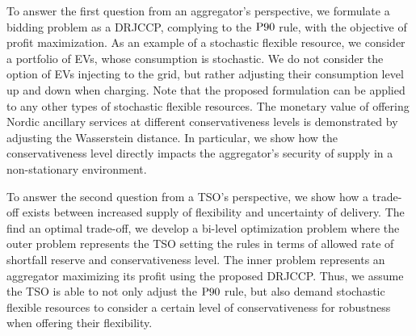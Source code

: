 \documentclass[conference]{IEEEtran}
\begin{document}
To answer the first question from an aggregator's perspective, we formulate a bidding problem as a \ac{DRJCCP}, complying to the $\rm{P90}$ rule, with the objective of profit maximization.  
As an example of a stochastic flexible resource, we consider a portfolio of \acp{EV}, whose consumption  is stochastic. We do not consider the option of EVs injecting to the grid, but rather adjusting their consumption level up and down when charging. 
Note that the proposed formulation can be applied to any other types of stochastic flexible resources. The monetary value of offering Nordic ancillary services at different conservativeness levels is demonstrated by adjusting the Wasserstein distance. In particular, we show how the conservativeness level directly impacts the aggregator's security of supply in a non-stationary environment.

To answer the second question from a TSO's perspective, we show how a trade-off exists between increased supply of flexibility  and uncertainty of delivery. The find an optimal trade-off, we develop a bi-level optimization problem where the outer problem represents the \ac{TSO} setting the rules in terms of allowed rate of shortfall reserve and conservativeness level. The inner problem represents an aggregator maximizing its profit using the proposed \ac{DRJCCP}. Thus, we assume the \ac{TSO} is able to not only adjust the $\rm{P90}$ rule, but also demand stochastic flexible resources to consider a  certain level of conservativeness for robustness when offering their flexibility.


\vspace{2mm}
\end{document}
